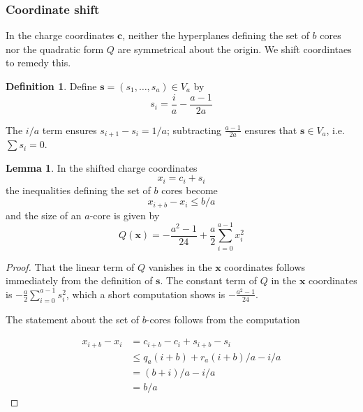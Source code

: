 \documentclass{amsart}[12pt]
\theoremstyle{definition}
\newtheorem{lemma}[dummy]{Lemma}
\newtheorem{definition}[dummy]{Definition}
\newcommand{\DP}{\mathcal{DP}}
\begin{document}








\subsubsection{Coordinate shift}
In the charge coordinates $\mathbf{c}$, neither the hyperplanes defining the set of $b$ cores nor the quadratic form $Q$ are symmetrical about the origin.  We shift coordintaes to remedy this.
\begin{definition}
Define $\mathbf{s}=(s_1,\dots, s_a)\in V_a$ by
$$s_i=\frac{i}{a}-\frac{a-1}{2a}$$
\end{definition}

The $i/a$ term ensures $s_{i+1}-s_i=1/a$; subtracting $\frac{a-1}{2a}$ ensures that  $\mathbf{s}\in V_a$, i.e. $\sum s_i=0$.
 
\begin{lemma}
In the shifted charge coordinates
$$x_i=c_i+s_i$$
the inequalities defining the set of $b$ cores become
$$x_{i+b}-x_{i}\leq b/a$$
and the size of an $a$-core is given by
$$Q(\mathbf{x})=-\frac{a^2-1}{24}+\frac{a}{2}\sum_{i=0}^{a-1} x_i^2$$
\end{lemma}

\begin{proof}
That the linear term of $Q$ vanishes in the $\mathbf{x}$ coordinates follows immediately from the definition of $\mathbf{s}$.  The constant term of $Q$ in the $\mathbf{x}$ coordinates is $-\frac{a}{2}\sum_{i=0}^{a-1} s_i^2$, which a short computation shows is $-\frac{a^2-1}{24}$.

The statement about the set of $b$-cores follows from the computation

\begin{align*}
x_{i+b}-x_{i}&=c_{i+b}-c_i+s_{i+b}-s_i \\
&\leq  q_a(i+b)+r_a(i+b)/a-i/a \\
&=(b+i)/a-i/a \\
&=b/a
\end{align*}
\end{proof}
\end{document}
